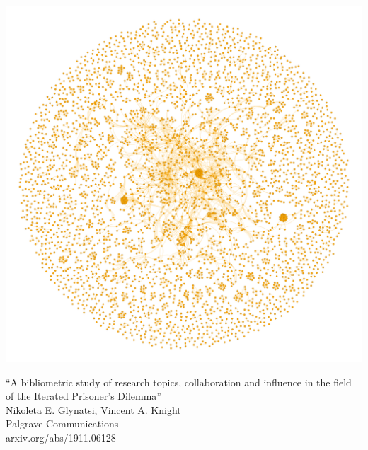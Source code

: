 \documentclass{beamer}
\begin{document}
\begin{frame}
    \begin{center}
    
    \end{center}
\end{frame}

\begin{frame}
    \begin{center}
    
    \end{center}
\end{frame}

\begin{frame}
    \begin{center}
        \includegraphics[width=.7\textwidth]{static/pd.png}
    \end{center}
\end{frame}

\begin{frame}
    \begin{center}
        \large{``A bibliometric study of research topics, collaboration and influence in the field of the Iterated Prisoner's Dilemma''} \\ \vspace{.5cm}
        \footnotesize{Nikoleta E. Glynatsi, Vincent A. Knight} \\ \vspace{.5cm}
        \footnotesize{Palgrave Communications} \\ \vspace{.5cm}
        \footnotesize{arxiv.org/abs/1911.06128}
    \end{center}
\end{frame}
\end{document}
